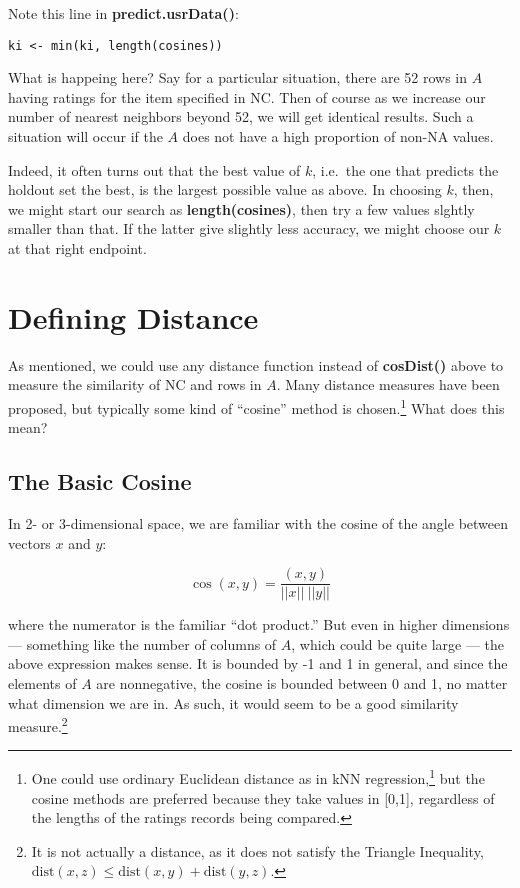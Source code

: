 Note this line in \textbf{predict.usrData()}:

\begin{lstlisting}
ki <- min(ki, length(cosines))
\end{lstlisting}

What is happeing here?  Say for a particular situation, there are 52
rows in $A$ having ratings for the item specified in NC.  Then of course
as we increase our number of nearest neighbors beyond 52, we will get
identical results.  Such a situation will occur if the $A$ does not have
a high proportion of non-NA values.  

Indeed, it often turns out that the best value of $k$, i.e.\ the one
that predicts the holdout set the best, is the largest possible value as
above.  In choosing $k$, then, we might start our search as
\textbf{length(cosines)}, then try a few values slghtly smaller than
that.  If the latter give slightly less accuracy, we might choose our
$k$ at that right endpoint.

\section{Defining Distance}

As mentioned, we could use any distance function instead of
\textbf{cosDist()} above to measure the similarity of NC and rows in
$A$.  Many distance measures have been proposed, but typically some kind
of ``cosine'' method is chosen.\footnote{One could use ordinary
Euclidean distance as in kNN regression,\footnote{This distance, say
from the vector $u$ to the vector $v$, is $||u - v||$, the ordinary
vector norm from linear algebra.} but the cosine methods are preferred
because they take values in [0,1], regardless of the lengths of the
ratings records being compared.} What does this mean?

\subsection{The Basic Cosine}

In 2- or 3-dimensional space, we are familiar with the cosine of the
angle between vectors $x$ and $y$:

\begin{equation}
\cos(x,y) = \frac{(x,y)}{||x|| ~ ||y||}
\end{equation}

where the numerator is the familiar ``dot product.''  But even in higher
dimensions --- something like the number of columns of $A$, which could
be quite large --- the above expression makes sense.  It is bounded by
-1 and 1 in general, and since the elements of $A$ are nonnegative, the
cosine is bounded between 0 and 1, no matter what dimension we are in.
As such, it would seem to be a good similarity measure.\footnote{It is
not actually a distance, as it does not satisfy the Triangle Inequality,
$\textrm{dist}(x,z) \leq \textrm{dist}(x,y) + \textrm{dist}(y,z)$.}

